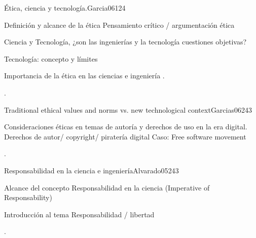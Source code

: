 \begin{syllabus}
\begin{unit}{}{Ética, ciencia y tecnología.}{Garcia06}{12}{4}
   \begin{topics}
      \item Definición y alcance de la ética Pensamiento crítico /  argumentación ética
      \item Ciencia y Tecnología, ¿son las ingenierías y la tecnología cuestiones objetivas? 
      \item Tecnología: concepto y límites
      \item Importancia de la ética en las ciencias e ingeniería .

   \end{topics}
   \begin{learningoutcomes}
      \item .
   \end{learningoutcomes}
\end{unit}

\begin{unit}{}{Traditional ethical values and norms vs. new technological context}{Garcias06}{24}{3}
   \begin{topics}
      \item Consideraciones éticas en temas de autoría y derechos de uso en la era digital. Derechos de autor/ copyright/ piratería digital  Caso: Free software movement

   \end{topics}

   \begin{learningoutcomes}
      \item .
      \end{learningoutcomes}
\end{unit}

\begin{unit}{}{Responsabilidad en la ciencia e ingeniería}{Alvarado05}{24}{3}
   \begin{topics}
      \item Alcance del concepto  Responsabilidad en la ciencia (Imperative of Responsability)
      \item Introducción al tema Responsabilidad / libertad 
      \end{topics}

   \begin{learningoutcomes}
      \item .
     
   \end{learningoutcomes}
\end{unit}


\end{syllabus}
